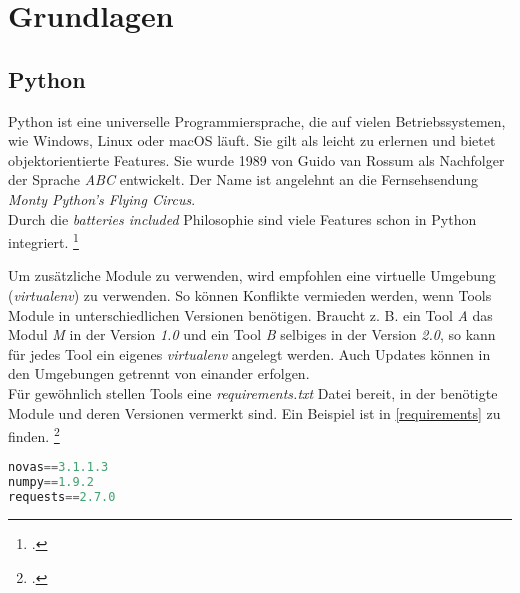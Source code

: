 % 
% 
% 


\chapter{Grundlagen} \label{theg}




\section{Python}
Python ist eine universelle Programmiersprache, die auf vielen Betriebssystemen, wie Windows, Linux oder macOS läuft. Sie gilt als leicht zu erlernen und bietet objektorientierte Features. Sie wurde 1989 von Guido van Rossum als Nachfolger der Sprache \textit{ABC} entwickelt. Der Name ist angelehnt an die Fernsehsendung \textit{Monty Python's Flying Circus}.\\
Durch die \textit{batteries included} Philosophie sind viele Features schon in Python integriert.
\footcite[Vgl.][1\psqq]{Gowrishankar_2019_Python}

Um zusätzliche Module zu verwenden, wird empfohlen eine virtuelle Umgebung (\textit{virtualenv}) zu verwenden. So können Konflikte vermieden werden, wenn Tools Module in unterschiedlichen Versionen benötigen. Braucht z. B. ein Tool \textit{A} das Modul \textit{M} in der Version \textit{1.0} und ein Tool \textit{B} selbiges in der Version \textit{2.0}, so kann für jedes Tool ein eigenes \textit{virtualenv} angelegt werden. Auch Updates können in den Umgebungen getrennt von einander erfolgen.\\
Für gewöhnlich stellen Tools eine \textit{requirements.txt} Datei bereit, in der benötigte Module und deren Versionen vermerkt sind. Ein Beispiel ist in \autoref{requirements} zu finden.
\footcite[Vgl.][o. \pno]{Python_venv}

\begin{lstlisting}[language=python, label=requirements, caption=Beispiel requirements.txt]
novas==3.1.1.3
numpy==1.9.2
requests==2.7.0
\end{lstlisting}


